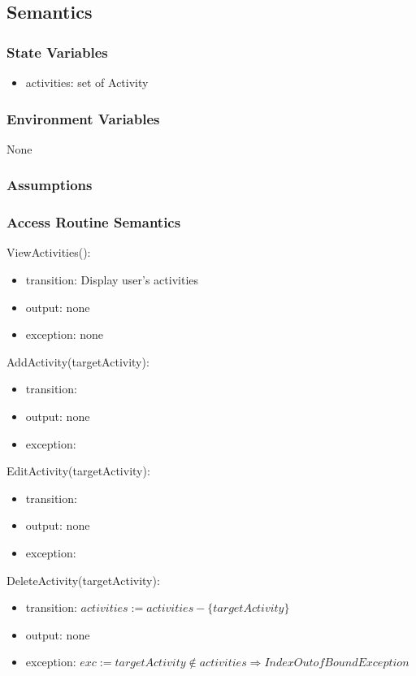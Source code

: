 \documentclass[12pt, titlepage]{article}
\begin{document}
\subsection{Semantics}

\subsubsection{State Variables}

\begin{itemize}
  \item activities: set of Activity
\end{itemize}

\subsubsection{Environment Variables}

None

\subsubsection{Assumptions}

\subsubsection{Access Routine Semantics}

ViewActivities():
\begin{itemize}
  \item transition: Display user's activities
  \item output: none
  \item exception: none
  \end{itemize}

AddActivity(targetActivity):
\begin{itemize}
  \item transition:
  \item output: none
  \item exception:
  \end{itemize}

EditActivity(targetActivity):
\begin{itemize}
  \item transition:
  \item output: none
  \item exception:
  \end{itemize}

DeleteActivity(targetActivity):
\begin{itemize}
  \item transition: $activities := activities - \{targetActivity\}$
  \item output: none
  \item exception: $exc := targetActivity \notin activities \Rightarrow IndexOutofBound Exception$
  \end{itemize}
\end{document}
